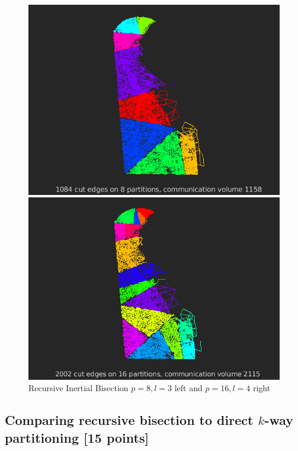 \documentclass[unicode,11pt,a4paper,oneside,numbers=endperiod,openany]{scrartcl}
\begin{document}
 \begin{figure}[h!]
  \begin{minipage}[c]{0.46\linewidth}
        \centering
        \includegraphics[width=0.8\linewidth]{./img/figure7.png}
    \end{minipage}
    \hfill%
    \begin{minipage}[c]{0.46\linewidth}
        \centering
        \includegraphics[width=0.8\linewidth]{./img/figure8.png}
    \end{minipage}
  \caption{Recursive Inertial Bisection ${p = 8, l = 3}$ left and ${ p = 16, l = 4}$ right}
  \label{fig:Another tiny Web}
\end{figure}


\newpage

\subsection{Comparing recursive bisection to direct $k$-way partitioning [15 points]}
\end{document}
